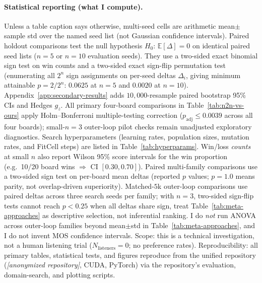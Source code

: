 \paragraph{Statistical reporting (what I compute).}
Unless a table caption says otherwise, multi-seed cells are arithmetic mean$\pm$sample std over the named seed list (not Gaussian confidence intervals).
Paired holdout comparisons test the null hypothesis $H_0{:}\,\mathbb{E}[\Delta]{=}0$ on identical paired seed lists ($n{=}5$ or $n{=}10$ evaluation seeds). They use a two-sided exact binomial sign test on win counts and a two-sided exact sign-flip permutation test (enumerating all $2^n$ sign assignments on per-seed deltas $\Delta_i$, giving minimum attainable $p{=}2/2^n$: $0.0625$ at $n{=}5$ and $0.0020$ at $n{=}10$). Appendix~\ref{app:secondary-results} adds $10{,}000$-resample paired bootstrap 95\% CIs and Hedges $g_z$.
All primary four-board comparisons in Table~\ref{tab:n2n-vs-ours} apply Holm--Bonferroni multiple-testing correction ($p_{\mathrm{adj}}{\le}0.0039$ across all four boards); small-$n{=}3$ outer-loop pilot checks remain unadjusted exploratory diagnostics.
Search hyperparameters (learning rates, population sizes, mutation rates, and FitCell steps) are listed in Table~\ref{tab:hyperparams}.
Win/loss \emph{counts} at small $n$ also report Wilson 95\% score intervals for the win proportion (e.g.\ 10/20 board wins $\Rightarrow$ CI $[0.30,0.70]$).
Paired multi-family comparisons use a two-sided sign test on per-board mean deltas (reported $p$ values; $p{=}1.0$ means parity, not overlap-driven superiority).
Matched-$5$k outer-loop comparisons use paired deltas across three search seeds per family; with $n{=}3$, two-sided sign-flip tests cannot reach $p<0.25$ when all deltas share sign, treat Table~\ref{tab:meta-approaches} as descriptive selection, not inferential ranking.
I do \emph{not} run ANOVA across outer-loop families beyond mean$\pm$std in Table~\ref{tab:meta-approaches}, and I do not invent MOS confidence intervals.
Scope: this is a technical investigation, not a human listening trial ($N_{\mathrm{listeners}}{=}0$; no preference rates).
Reproducibility: all primary tables, statistical tests, and figures reproduce from the unified repository (\textit{[anonymized repository]}, CUDA, PyTorch) via the repository's evaluation, domain-search, and plotting scripts.

